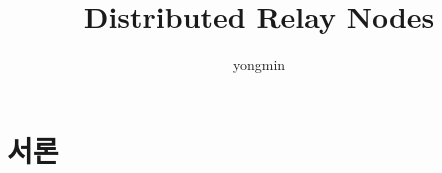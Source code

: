 \documentclass[8pt,a4paper,left=8mm,right=8mm,top=10mm,bottom=10mm]{article}
\title{Distributed Relay Nodes}
\author{yongmin}
\begin{document}
\maketitle

\tableofcontents
\listoffigures

\newpage
\section{서론}
\end{document}
